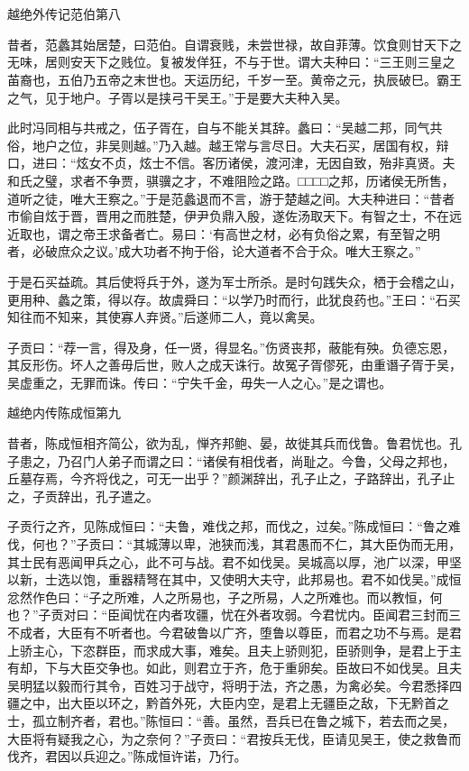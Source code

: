 \documentclass[12pt,UTF8]{ctexbook}
\begin{document}
\part{}

越绝外传记范伯第八

昔者，范蠡其始居楚，曰范伯。自谓衰贱，未尝世禄，故自菲薄。饮食则甘天下之无味，居则安天下之贱位。复被发佯狂，不与于世。谓大夫种曰：“三王则三皇之苖裔也，五伯乃五帝之末世也。天运历纪，千岁一至。黄帝之元，执辰破巳。霸王之气，见于地户。子胥以是挟弓干吴王。”于是要大夫种入吴。

此时冯同相与共戒之，伍子胥在，自与不能关其辞。蠡曰：“吴越二邦，同气共俗，地户之位，非吴则越。”乃入越。越王常与言尽日。大夫石买，居国有权，辩口，进曰：“炫女不贞，炫士不信。客历诸侯，渡河津，无因自致，殆非真贤。夫和氏之璧，求者不争贾，骐骥之才，不难阻险之路。□□□□之邦，历诸侯无所售，道听之徒，唯大王察之。”于是范蠡退而不言，游于楚越之间。大夫种进曰：“昔者市偷自炫于晋，晋用之而胜楚，伊尹负鼎入殷，遂佐汤取天下。有智之士，不在远近取也，谓之帝王求备者亡。易曰：‘有高世之材，必有负俗之累，有至智之明者，必破庶众之议。’成大功者不拘于俗，论大道者不合于众。唯大王察之。”

于是石买益疏。其后使将兵于外，遂为军士所杀。是时句践失众，栖于会稽之山，更用种、蠡之策，得以存。故虞舜曰：“以学乃时而行，此犹良药也。”王曰：“石买知往而不知来，其使寡人弃贤。”后遂师二人，竟以禽吴。

子贡曰：“荐一言，得及身，任一贤，得显名。”伤贤丧邦，蔽能有殃。负德忘恩，其反形伤。坏人之善毋后世，败人之成天诛行。故冤子胥僇死，由重谮子胥于吴，吴虚重之，无罪而诛。传曰：“宁失千金，毋失一人之心。”是之谓也。

越绝内传陈成恒第九

昔者，陈成恒相齐简公，欲为乱，惮齐邦鲍、晏，故徙其兵而伐鲁。鲁君忧也。孔子患之，乃召门人弟子而谓之曰：“诸侯有相伐者，尚耻之。今鲁，父母之邦也，丘墓存焉，今齐将伐之，可无一出乎？”颜渊辞出，孔子止之，子路辞出，孔子止之，子贡辞出，孔子遣之。

子贡行之齐，见陈成恒曰：“夫鲁，难伐之邦，而伐之，过矣。”陈成恒曰：“鲁之难伐，何也？”子贡曰：“其城薄以卑，池狭而浅，其君愚而不仁，其大臣伪而无用，其士民有恶闻甲兵之心，此不可与战。君不如伐吴。吴城高以厚，池广以深，甲坚以新，士选以饱，重器精弩在其中，又使明大夫守，此邦易也。君不如伐吴。”成恒忿然作色曰：“子之所难，人之所易也，子之所易，人之所难也。而以教恒，何也？”子贡对曰：“臣闻忧在内者攻疆，忧在外者攻弱。今君忧内。臣闻君三封而三不成者，大臣有不听者也。今君破鲁以广齐，堕鲁以尊臣，而君之功不与焉。是君上骄主心，下恣群臣，而求成大事，难矣。且夫上骄则犯，臣骄则争，是君上于主有却，下与大臣交争也。如此，则君立于齐，危于重卵矣。臣故曰不如伐吴。且夫吴明猛以毅而行其令，百姓习于战守，将明于法，齐之愚，为禽必矣。今君悉择四疆之中，出大臣以环之，黔首外死，大臣内空，是君上无疆臣之敌，下无黔首之士，孤立制齐者，君也。”陈恒曰：“善。虽然，吾兵已在鲁之城下，若去而之吴，大臣将有疑我之心，为之奈何？”子贡曰：“君按兵无伐，臣请见吴王，使之救鲁而伐齐，君因以兵迎之。”陈成恒许诺，乃行。
\end{document}
